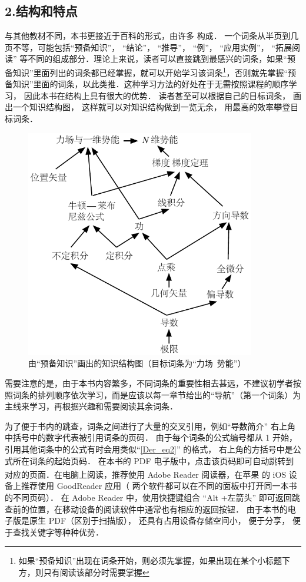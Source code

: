 \subsection{2.结构和特点}
与其他教材不同，本书更接近于百科的形式，由许多 构成． 一个词条从半页到几页不等，可能包括“预备知识”， “结论”， “推导”， “例”， “应用实例”， “拓展阅读” 等不同的组成部分．理论上来说，读者可以直接跳到最感兴的词条，如果“预备知识”里面列出的词条都已经掌握，就可以开始学习该词条\footnote{如果“预备知识”出现在词条开始，则必须先掌握，如果出现在某个小标题下方，则只有阅读该部分时需要掌握}，否则就先掌握“预备知识”里面的词条，以此类推．这种学习方法的好处在于无需按照课程的顺序学习， 因此本书在结构上具有很大的优势．  读者甚至可以根据自己的目标词条， 画出一个知识结构图， 这样就可以对知识结构做到一览无余， 用最高的效率攀登目标词条．

\begin{figure}[ht]
\centering
\includegraphics[width=10cm]{./figures/flowchart_example.pdf}
\caption{由“预备知识”画出的知识结构图（目标词条为“力场\ 势能”）}
\end{figure}

需要注意的是，由于本书内容繁多，不同词条的重要性相去甚远，不建议初学者按照词条的排列顺序依次学习，而是应该以每一章节给出的“导航”（第一个词条）为主线来学习，再根据兴趣和需要阅读其余词条．

为了便于书内的跳查，词条之间进行了大量的交叉引用，例如“导数简介” 右上角中括号中的数字代表被引用词条的页码． 由于每个词条的公式编号都从 1 开始， 引用其他词条中的公式有时会用类似“\autoref{Der_eq2}” 的格式， 右上角的方括号中是公式所在词条的起始页码． 在本书的 PDF 电子版中，点击该页码即可自动跳转到对应的页面．在电脑上阅读，推荐使用 Adobe Reader 阅读器，在苹果\textsuperscript{\textregistered} 的 iOS 设备上推荐使用 GoodReader 应用（ 两个软件都可以在不同的面板中打开同一本书的不同页码）． 在 Adobe Reader 中，使用快捷键组合 “Alt +左箭头” 即可返回跳查前的位置，在移动设备的阅读软件中通常也有相应的返回按钮． 由于本书的电子版是原生 PDF（区别于扫描版）， 还具有占用设备存储空间小， 便于分享， 便于查找关键字等种种优势．

